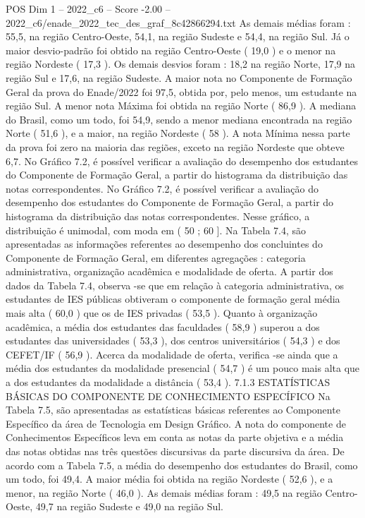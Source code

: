 \begin{textsample}{POS Dim 1 – 2022\_c6 – Score -2.00 – 2022\_c6/enade\_2022\_tec\_des\_graf\_8c42866294.txt}
As demais médias foram : 55,5, na região Centro-Oeste, 54,1, na região Sudeste e 54,4, na região Sul.
Já o maior desvio-padrão foi obtido na região Centro-Oeste ( 19,0 ) e o menor na região Nordeste ( 17,3 ).
Os demais desvios foram : 18,2 na região Norte, 17,9 na região Sul e 17,6, na região Sudeste.
A maior nota no Componente de Formação Geral da prova do Enade/2022 foi 97,5, obtida por, pelo menos, um estudante na região Sul.
A menor nota Máxima foi obtida na região Norte ( 86,9 ).
A mediana do Brasil, como um todo, foi 54,9, sendo a menor mediana encontrada na região Norte ( 51,6 ), e a maior, na região Nordeste ( 58 ).
A nota Mínima nessa parte da prova foi zero na maioria das regiões, exceto na região Nordeste que obteve 6,7.
No Gráfico 7.2, é possível verificar a avaliação do desempenho dos estudantes do Componente de Formação Geral, a partir do histograma da distribuição das notas correspondentes.
No Gráfico 7.2, é possível verificar a avaliação do desempenho dos estudantes do Componente de Formação Geral, a partir do histograma da distribuição das notas correspondentes.
Nesse gráfico, a distribuição é unimodal, com moda em ( 50 ; 60 ].
Na Tabela 7.4, são apresentadas as informações referentes ao desempenho dos concluintes do Componente de Formação Geral, em diferentes agregações : categoria administrativa, organização acadêmica e modalidade de oferta.
A partir dos dados da Tabela 7.4, observa -se que em relação à categoria administrativa, os estudantes de IES públicas obtiveram o componente de formação geral média mais alta ( 60,0 ) que os de IES privadas ( 53,5 ).
Quanto à organização acadêmica, a média dos estudantes das faculdades ( 58,9 ) superou a dos estudantes das universidades ( 53,3 ), dos centros universitários ( 54,3 ) e dos CEFET/IF ( 56,9 ).
Acerca da modalidade de oferta, verifica -se ainda que a média dos estudantes da modalidade presencial ( 54,7 ) é um pouco mais alta que a dos estudantes da modalidade a distância ( 53,4 ). 7.1.3 ESTATÍSTICAS BÁSICAS DO COMPONENTE DE CONHECIMENTO ESPECÍFICO Na Tabela 7.5, são apresentadas as estatísticas básicas referentes ao Componente Específico da área de Tecnologia em Design Gráfico.
A nota do componente de Conhecimentos Específicos leva em conta as notas da parte objetiva e a média das notas obtidas nas três questões discursivas da parte discursiva da área.
De acordo com a Tabela 7.5, a média do desempenho dos estudantes do Brasil, como um todo, foi 49,4.
A maior média foi obtida na região Nordeste ( 52,6 ), e a menor, na região Norte ( 46,0 ).
As demais médias foram : 49,5 na região Centro-Oeste, 49,7 na região Sudeste e 49,0 na região Sul.

\end{textsample}
